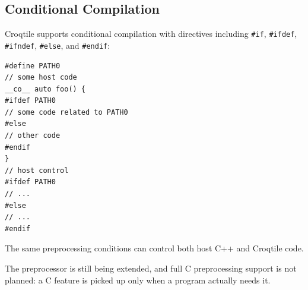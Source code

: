 \subsection*{Conditional Compilation}

Croqtile supports conditional compilation with directives including \texttt{\#if}, \texttt{\#ifdef}, \texttt{\#ifndef}, \texttt{\#else}, and \texttt{\#endif}:

\begin{lstlisting}[language=croqtile,caption={Conditional Compilation}]
#define PATH0
// some host code
__co__ auto foo() {
#ifdef PATH0
// some code related to PATH0
#else
// other code
#endif
}
// host control
#ifdef PATH0
// ...
#else
// ...
#endif
\end{lstlisting}

The same preprocessing conditions can control both host C++ and Croqtile code.

The preprocessor is still being extended, and full C preprocessing support is not planned: a C feature is picked up only when a program actually needs it.
